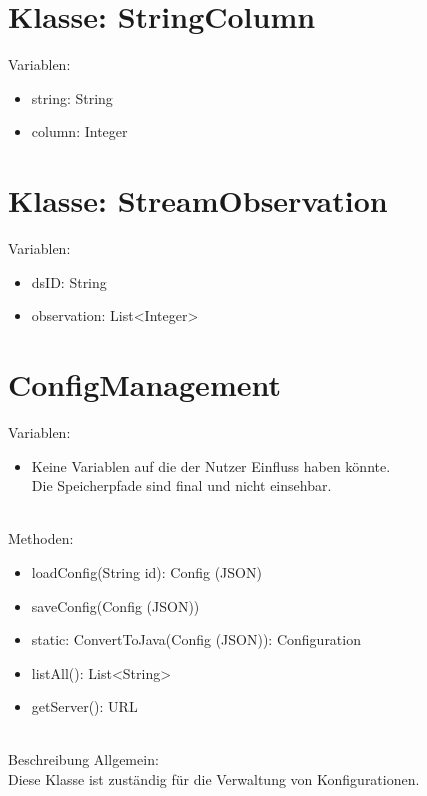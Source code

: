 \documentclass[a4paper, 12 pt, titlepage]{article}
\begin{document}
\section{Klasse: StringColumn}
Variablen:
\begin{itemize}
	\item string: String
	\item column: Integer
\end{itemize} 

\section{Klasse: StreamObservation}
Variablen: 
\begin{itemize}
	\item dsID: String
	\item observation: List<Integer>
\end{itemize}

\section{ConfigManagement}
Variablen:
\begin{itemize}
	\item Keine Variablen auf die der Nutzer Einfluss haben könnte.\\
		Die Speicherpfade sind final und nicht einsehbar.
		
\end{itemize}
\ \\
Methoden:
\begin{itemize}
	\item loadConfig(String id): Config (JSON)
	\item saveConfig(Config (JSON))
	\item static: ConvertToJava(Config (JSON)): Configuration
	\item listAll(): List<String>
	\item getServer(): URL
\end{itemize}
\ \\
Beschreibung Allgemein:\\
Diese Klasse ist zuständig für die Verwaltung von Konfigurationen.
\end{document}
